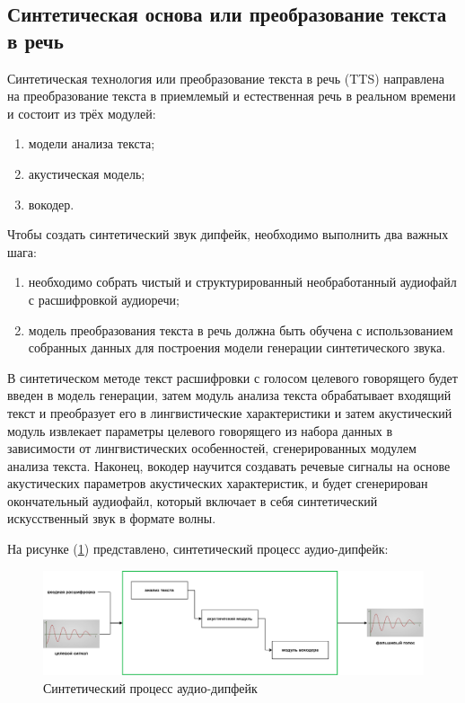 \subsection{Синтетическая основа или преобразование текста в речь}

Синтетическая технология или преобразование текста в речь (TTS) направлена на 
преобразование текста в приемлемый и естественная речь в реальном времени \cite{tan2021survey} и состоит из трёх модулей: 

\begin{enumerate}
    \item модели анализа текста;
    \item акустическая модель;
    \item вокодер.
\end{enumerate}

Чтобы создать синтетический звук дипфейк, необходимо выполнить два важных шага:

\begin{enumerate}
    \item необходимо собрать чистый и структурированный необработанный аудиофайл с расшифровкой аудиоречи;
    \item модель преобразования текста в речь должна быть обучена с использованием собранных данных для построения модели генерации синтетического звука.
\end{enumerate}

В синтетическом методе текст расшифровки с голосом целевого говорящего будет введен в модель генерации, затем модуль анализа текста обрабатывает входящий текст и преобразует его в лингвистические характеристики и затем акустический модуль извлекает параметры целевого говорящего из набора данных в зависимости от лингвистических особенностей, сгенерированных модулем анализа текста. Наконец, вокодер научится создавать речевые сигналы на основе акустических параметров акустических характеристик, и будет сгенерирован окончательный аудиофайл, который включает в себя синтетический искусственный звук в формате волны.

На рисунке (\ref{fig:synth-deepfake}) представлено, синтетический процесс аудио-дипфейк: 
\begin{figure}[H]
	\centering
	\includegraphics[width=0.8\linewidth]{images/synthetic-based.png}
	\caption{Синтетический процесс аудио-дипфейк}
	\label{fig:synth-deepfake}
\end{figure}

